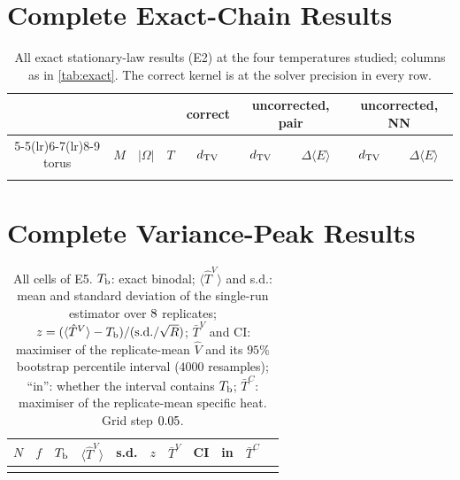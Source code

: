 \appendix
\section{Complete Exact-Chain Results}
\label{app:exact}
\begin{table}[h]
\centering\small
\caption{All exact stationary-law results (E2) at the four temperatures studied; columns as in \cref{tab:exact}. The correct kernel is at the solver precision in every row.}
\label{tab:exact-full}
\begin{tabular}{@{}cccc c cc cc@{}}
\toprule
 &  &  &  & correct & \multicolumn{2}{c}{uncorrected, pair} & \multicolumn{2}{c}{uncorrected, NN}\\
\cmidrule(lr){5-5}\cmidrule(lr){6-7}\cmidrule(lr){8-9}
torus & $M$ & $|\Omega|$ & $T$ & $d_{\mathrm{TV}}$ & $d_{\mathrm{TV}}$ & $\Delta\langle E\rangle$ & $d_{\mathrm{TV}}$ & $\Delta\langle E\rangle$\\
\midrule
\\
\bottomrule
\end{tabular}
\end{table}

\section{Complete Variance-Peak Results}
\label{app:demix}
\begin{table}[h]
\centering\footnotesize
\caption{All cells of E5. $T_{\mathrm b}$: exact binodal; $\langle\hat T^V\rangle$ and s.d.: mean and standard deviation of the single-run estimator over $8$ replicates; $z=(\langle\hat T^V\rangle-T_{\mathrm b})/(\mathrm{s.d.}/\sqrt{R})$; $\bar T^V$ and CI: maximiser of the replicate-mean $\hat V$ and its $95\%$ bootstrap percentile interval ($4000$ resamples); ``in'': whether the interval contains $T_{\mathrm b}$; $\bar T^C$: maximiser of the replicate-mean specific heat. Grid step $0.05$.}
\label{tab:demix}
\setlength{\tabcolsep}{4pt}
\begin{tabular}{@{}rcccccccccc@{}}
\toprule
$N$ & $f$ & $T_{\mathrm b}$ & $\langle\hat T^V\rangle$ & s.d. & $z$ & $\bar T^V$ & CI & in & $\bar T^C$\\
\midrule
\\
\bottomrule
\end{tabular}
\end{table}

